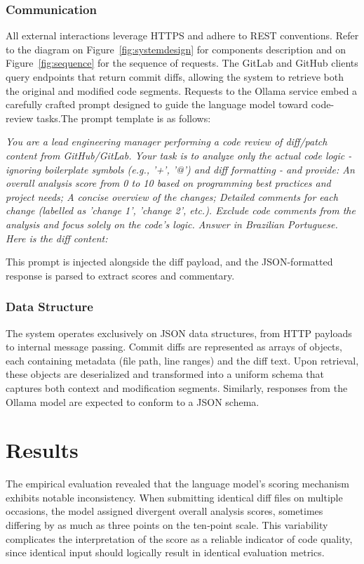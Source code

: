 \documentclass[12pt]{article}
\begin{document}
\subsubsection{Communication}
All external interactions leverage HTTPS and adhere to REST conventions. Refer to the diagram on Figure~\ref{fig:systemdesign} for components description and on Figure~\ref{fig:sequence} for the sequence of requests.
The GitLab and GitHub clients query endpoints that return commit diffs, allowing the system to retrieve both the original and modified code segments. Requests to the Ollama service embed a carefully crafted prompt designed to guide the language model toward code-review tasks.The prompt template is as follows:

\textit{
You are a lead engineering manager performing a code review of diff/patch content from GitHub/GitLab. 
Your task is to analyze only the actual code logic -ignoring boilerplate symbols (e.g., '+', '@') and diff formatting - and provide:
An overall analysis score from 0 to 10 based on programming best practices and project needs; A concise overview of the changes; Detailed comments for each change (labelled as 'change 1', 'change 2', etc.). Exclude code comments from the analysis and focus solely on the code's logic. Answer in Brazilian Portuguese. Here is the diff content:
}

This prompt is injected alongside the diff payload, and the JSON-formatted response is parsed to extract scores and commentary.

\subsubsection{Data Structure}
The system operates exclusively on JSON data structures, from HTTP payloads to internal message passing. Commit diffs are represented as arrays of objects, each containing metadata (file path, line ranges) and the diff text. Upon retrieval, these objects are deserialized and transformed into a uniform schema that captures both context and modification segments. Similarly, responses from the Ollama model are expected to conform to a JSON schema.

\section{Results}

The empirical evaluation revealed that the language model's scoring mechanism exhibits notable inconsistency. When submitting identical diff files on multiple occasions, the model assigned divergent overall analysis scores, sometimes differing by as much as three points on the ten‑point scale. This variability complicates the interpretation of the score as a reliable indicator of code quality, since identical input should logically result in identical evaluation metrics. 
\end{document}
